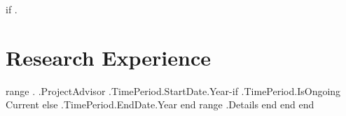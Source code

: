 {{if .}}
\section{Research Experience}
    \resumeSubHeadingListStart
    {{range .}}
        { {{.ProjectAdvisor}} }{ {{.TimePeriod.StartDate.Year}}-{{if .TimePeriod.IsOngoing}} Current {{else}} {{.TimePeriod.EndDate.Year}} {{end}} }
        \resumeItemListStart
            {{range .Details}} 
            {{end}}
            \resumeItemListEnd
    {{end}}
    \resumeSubHeadingListEnd
\vspace{-16pt}
{{end}}